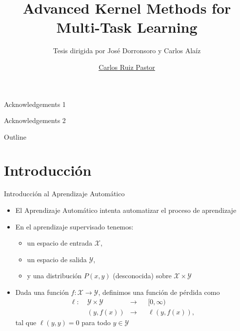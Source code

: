 \documentclass{beamer}
\title{Advanced Kernel Methods for
Multi-Task Learning}
\subtitle{Tesis dirigida por José Dorronsoro y Carlos Alaíz}
\author{\href{mailto:carlos.ruizp@uam.es}{Carlos Ruiz Pastor}}
\newcommand{\lossf}{\ell}
\newcommand{\Xspace}{\mathcal{X}}
\newcommand{\Yspace}{\mathcal{Y}}
\begin{document}
\maketitle

\begin{frame}

Acknowledgements 1

\vspace{\baselineskip}

Acknowledgements 2

\end{frame}


\begin{frame}{Outline}{}
      \tableofcontents
\end{frame}

\section{Introducción}

\begin{frame}
      {Introducción al Aprendizaje Automático}

      \begin{itemize}
            \item El Aprendizaje Automático intenta automatizar el proceso de aprendizaje
            \item En el aprendizaje supervisado tenemos:
            \begin{itemize}
                  \item un espacio de entrada $\Xspace$,
                  \item un espacio de salida $\Yspace$,
                  \item y una distribución $P(x, y)$ (desconocida) sobre $\Xspace \times \Yspace$
            \end{itemize} 
            \item Dada una función $f: \Xspace \to \Yspace$, definimos una función de pérdida como
            \begin{equation}
                  \begin{aligned}
              \nonumber
              \lossf:\; &\Yspace \times \Yspace &\to &&[0, \infty) \\
              &(y, f(x)) &\to  && \lossf(y, f(x)) ,
          \end{aligned}
          \end{equation}
          tal que $\lossf(y, y) = 0$ para todo $y \in \Yspace$
            
      \end{itemize}
      
\end{frame}
\end{document}
